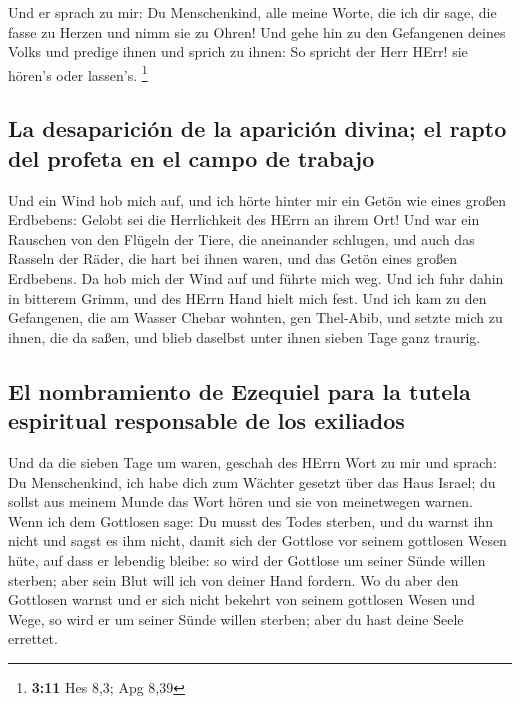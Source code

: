  Und er sprach zu mir: Du Menschenkind, alle meine Worte,
die ich dir sage, die fasse zu Herzen und nimm sie zu Ohren!
 Und gehe hin zu den Gefangenen deines Volks und predige
ihnen und sprich zu ihnen: So spricht der Herr HErr! sie hören's oder
lassen's. \footnote{\textbf{3:11} Hes 8,3; Apg 8,39}

\hypertarget{la-desapariciuxf3n-de-la-apariciuxf3n-divina-el-rapto-del-profeta-en-el-campo-de-trabajo}{%
\subsection{La desaparición de la aparición divina; el rapto del profeta
en el campo de
trabajo}\label{la-desapariciuxf3n-de-la-apariciuxf3n-divina-el-rapto-del-profeta-en-el-campo-de-trabajo}}

 Und ein Wind hob mich auf, und ich hörte hinter mir ein
Getön wie eines großen Erdbebens: Gelobt sei die Herrlichkeit des HErrn
an ihrem Ort!  Und war ein Rauschen von den Flügeln der
Tiere, die aneinander schlugen, und auch das Rasseln der Räder, die hart
bei ihnen waren, und das Getön eines großen Erdbebens. 
Da hob mich der Wind auf und führte mich weg. Und ich fuhr dahin in
bitterem Grimm, und des HErrn Hand hielt mich fest.  Und
ich kam zu den Gefangenen, die am Wasser Chebar wohnten, gen Thel-Abib,
und setzte mich zu ihnen, die da saßen, und blieb daselbst unter ihnen
sieben Tage ganz traurig.

\hypertarget{el-nombramiento-de-ezequiel-para-la-tutela-espiritual-responsable-de-los-exiliados}{%
\subsection{El nombramiento de Ezequiel para la tutela espiritual
responsable de los
exiliados}\label{el-nombramiento-de-ezequiel-para-la-tutela-espiritual-responsable-de-los-exiliados}}

 Und da die sieben Tage um waren, geschah des HErrn Wort
zu mir und sprach:  Du Menschenkind, ich habe dich zum
Wächter gesetzt über das Haus Israel; du sollst aus meinem Munde das
Wort hören und sie von meinetwegen warnen.  Wenn ich dem
Gottlosen sage: Du musst des Todes sterben, und du warnst ihn nicht und
sagst es ihm nicht, damit sich der Gottlose vor seinem gottlosen Wesen
hüte, auf dass er lebendig bleibe: so wird der Gottlose um seiner Sünde
willen sterben; aber sein Blut will ich von deiner Hand fordern.
 Wo du aber den Gottlosen warnst und er sich nicht
bekehrt von seinem gottlosen Wesen und Wege, so wird er um seiner Sünde
willen sterben; aber du hast deine Seele errettet.

